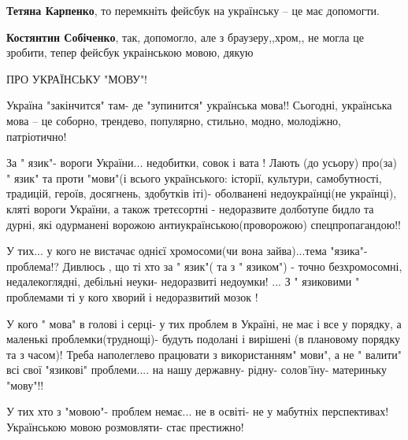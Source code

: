 \begin{itemize}
\begin{itemize}
\textbf{Тетяна Карпенко}, то перемкніть фейсбук на українську -- це має допомогти.

 
\textbf{Костянтин Собіченко}, так, допомогло, але з браузеру,,хром,, не могла це зробити, тепер фейсбук украінською мовою, дякую

\end{itemize}

 

ПРО УКРАЇНСЬКУ "МОВУ"!

Україна "закінчится" там- де "зупинится" українська мова!! Сьогодні, українська
мова – це соборно, трендево, популярно, стильно, модно, молодіжно, патріотично!

За " язик"- вороги України... недобитки, совок і вата ! Лають (до усьору)
про(за) " язик" та проти "мови"(і всього українського: історії, культури,
самобутності, традицій, героїв, досягнень, здобутків іті)- оболванені
недоукраїнці(не українці), кляті вороги України, а також третєсортні -
недоразвите долботупе бидло та дурні, які одурманені ворожою
антиукраїнською(проворожою) спецпропагандою!!

У тих... у кого не вистачає однієї хромосоми(чи вона зайва)...тема "язика"-
проблема!? Дивлюсь , що ті хто за " язик"( та з " язиком") - точно
безхромосомні, недалекоглядні, дебільні неуки- недоразвиті недоумки! ... З "
язиковими " проблемами ті у кого хворий і недоразвитий мозок !

У кого " мова" в голові і серці- у тих проблем в Україні, не має і все у
порядку, а маленькі проблемки(труднощі)- будуть подолані і вирішені (в
плановому порядку та з часом)! Треба наполеглево працювати з використанням"
мови", а не " валити" всі свої "язикові" проблеми.... на нашу державну- рідну-
солов'їну- материньку "мову"!!

У тих хто з "мовою"- проблем немає... не в освіті- не у мабутніх перспективах!
Українською мовою розмовляти- стає престижно!

\end{itemize}

